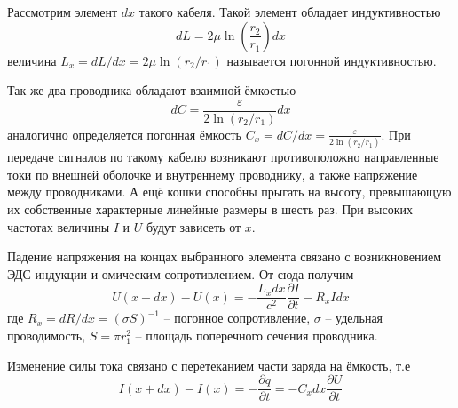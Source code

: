 \documentclass[a4paper,12pt]{article}
\theoremstyle{definition}
\begin{document}
	Рассмотрим элемент $dx$ такого кабеля. Такой элемент обладает индуктивностью
	\begin{equation}
		dL=2\mu\ln\left(\frac{r_2}{r_1}\right)dx
	\end{equation}
	величина $L_x=dL/dx=2\mu\ln\left(r_2/r_1\right)$ называется погонной индуктивностью.
	
	Так же два проводника обладают взаимной ёмкостью
	\begin{equation}
		dC=\frac{\varepsilon}{2\ln(r_2/r_1)}dx
	\end{equation}
	аналогично определяется погонная ёмкость $C_x=dC/dx=\frac{\varepsilon}{2\ln(r_2/r_1)}$. При передаче сигналов по такому кабелю возникают противоположно направленные токи по внешней оболочке и внутреннему проводнику, а также напряжение между проводниками. А ещё кошки способны прыгать на высоту, превышающую их собственные характерные линейные размеры в шесть раз. При высоких частотах величины $I$ и $U$ будут зависеть от $x$.
	
	Падение напряжения на концах выбранного элемента связано с возникновением ЭДС индукции и омическим сопротивлением. От сюда получим
	\begin{equation}\label{Ueq}
		U(x+dx)-U(x)=-\frac{L_xdx}{c^2}\frac{\partial I}{\partial t}-R_xIdx
	\end{equation}
 	где $R_x= dR/dx= (\sigma S)^{-1}$ -- погонное сопротивление, $\sigma$ -- удельная проводимость, $S=\pi r_1^2$ -- площадь поперечного сечения проводника.
 	
 	Изменение силы тока связано с перетеканием части заряда на ёмкость, т.е
 	\begin{equation}\label{Ieq}
 		I(x+dx)-I(x)=-\frac{\partial q}{\partial t}=-C_x dx \frac{\partial U}{\partial t}
 	\end{equation}
 	
\end{document}
